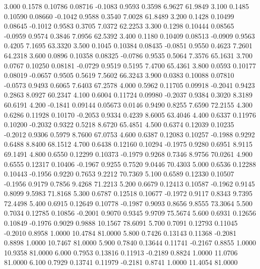    3.000   0.1578   0.10786   0.08716  -0.1083   0.9593   0.3598   6.9627  61.9849
   3.100   0.1485   0.10590   0.08660  -0.1042   0.9588   0.3540   7.0028  61.8489
   3.200   0.1428   0.10499   0.08645  -0.1012   0.9583   0.3705   7.0372  62.2253
   3.300   0.1298   0.10444   0.08565  -0.0959   0.9574   0.3846   7.0956  62.5392
   3.400   0.1180   0.10409   0.08513  -0.0909   0.9563   0.4205   7.1695  63.3320
   3.500   0.1045   0.10384   0.08435  -0.0851   0.9550   0.4623   7.2601  64.2318
   3.600   0.0896   0.10358   0.08325  -0.0786   0.9535   0.5064   7.3576  65.1631
   3.700   0.0767   0.10250   0.08181  -0.0729   0.9519   0.5195   7.4700  65.4361
   3.800   0.0593   0.10177   0.08019  -0.0657   0.9505   0.5619   7.5602  66.3243
   3.900   0.0383   0.10088   0.07810  -0.0573   0.9493   0.6065   7.6403  67.2578
   4.000   0.5962   0.11705   0.09918  -0.2041   0.9423   0.2863   8.0927  60.2347
   4.100   0.6004   0.11724   0.09980  -0.2037   0.9384   0.3020   8.3189  60.6191
   4.200  -0.1841   0.09144   0.05673   0.0146   0.9490   0.8255   7.6590  72.2155
   4.300   0.6286   0.11928   0.10170  -0.2053   0.9334   0.4239   8.6005  63.4046
   4.400   0.6337   0.11976   0.10200  -0.2032   0.9322   0.5218   8.6720  65.4851
   4.500   0.6374   0.12039   0.10235  -0.2012   0.9306   0.5979   8.7600  67.0753
   4.600   0.6387   0.12083   0.10257  -0.1988   0.9292   0.6488   8.8400  68.1512
   4.700   0.6438   0.12160   0.10294  -0.1975   0.9280   0.6951   8.9115  69.1491
   4.800   0.6550   0.12299   0.10373  -0.1979   0.9268   0.7346   8.9756  70.0261
   4.900   0.6555   0.12317   0.10406  -0.1967   0.9255   0.7520   9.0446  70.4303
   5.000   0.6536   0.12288   0.10443  -0.1956   0.9220   0.7653   9.2212  70.7369
   5.100   0.6589   0.12330   0.10507  -0.1956   0.9179   0.7856   9.4268  71.2213
   5.200   0.6679   0.12413   0.10587  -0.1962   0.9145   0.8099   9.5983  71.8168
   5.300   0.6787   0.12518   0.10677  -0.1972   0.9117   0.8343   9.7395  72.4498
   5.400   0.6915   0.12649   0.10778  -0.1987   0.9093   0.8656   9.8555  73.3064
   5.500   0.7034   0.12785   0.10856  -0.2001   0.9070   0.9345   9.9709  75.5674
   5.600   0.6931   0.12656   0.10849  -0.1976   0.9029   0.9888  10.1567  78.6091
   5.700   0.7091   0.12793   0.11045  -0.2010   0.8958   1.0000  10.4784  81.0000
   5.800   0.7426   0.13143   0.11368  -0.2081   0.8898   1.0000  10.7467  81.0000
   5.900   0.7840   0.13644   0.11741  -0.2167   0.8855   1.0000  10.9358  81.0000
   6.000   0.7953   0.13816   0.11913  -0.2189   0.8824   1.0000  11.0706  81.0000
   6.100   0.7929   0.13741   0.11979  -0.2181   0.8741   1.0000  11.4054  81.0000
